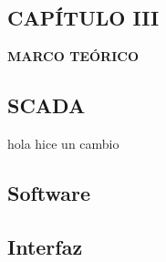 \begin{center}
    \setcounter{section}{3}
    \setcounter{subsection}{0}
    \section*{CAPÍTULO III}
    \vspace*{0.5in}
    \textbf{MARCO TEÓRICO}
\end{center}

\subsection{SCADA}
hola hice un cambio 
\subsection{Software}
\subsection{Interfaz}
\subsection{}
\newpage